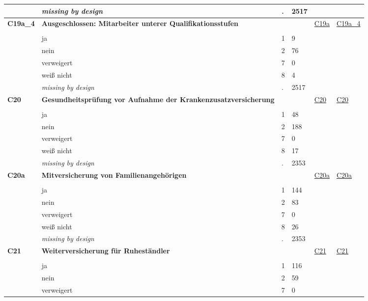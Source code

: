 \begin{longtable}{| L{2.45cm} | L{6cm} | C{1.5cm} | R{1cm} | C{2.25cm} | C{2.25cm} |}
   & \textit{missing by design} & \textit{.} & 2517 &  &  \\ 
   \midrule
\textbf{C19a\_4}\label{var:C19a:4} & \textbf{Ausgeschlossen: Mitarbeiter unterer Qualifikationsstufen} &  &  & \hyperref[C19a]{C19a} & \hyperref[var:suf:C19a:4]{C19a\_4} \\ 
   &  &  &  &  &  \\ 
   & ja & 1 & 9 &  &  \\ 
   & nein & 2 & 76 &  &  \\ 
   & verweigert & 7 & 0 &  &  \\ 
   & weiß nicht & 8 & 4 &  &  \\ 
   & \textit{missing by design} & \textit{.} & 2517 &  &  \\ 
   \midrule
\textbf{C20}\label{var:C20} & \textbf{Gesundheitsprüfung vor Aufnahme der Krankenzusatzversicherung} &  &  & \hyperref[C20]{C20} & \hyperref[var:suf:C20]{C20} \\ 
   &  &  &  &  &  \\ 
   & ja & 1 & 48 &  &  \\ 
   & nein & 2 & 188 &  &  \\ 
   & verweigert & 7 & 0 &  &  \\ 
   & weiß nicht & 8 & 17 &  &  \\ 
   & \textit{missing by design} & \textit{.} & 2353 &  &  \\ 
   \midrule
\textbf{C20a}\label{var:C20a} & \textbf{Mitversicherung von Familienangehörigen} &  &  & \hyperref[C20a]{C20a} & \hyperref[var:suf:C20a]{C20a} \\ 
   &  &  &  &  &  \\ 
   & ja & 1 & 144 &  &  \\ 
   & nein & 2 & 83 &  &  \\ 
   & verweigert & 7 & 0 &  &  \\ 
   & weiß nicht & 8 & 26 &  &  \\ 
   & \textit{missing by design} & \textit{.} & 2353 &  &  \\ 
   \midrule
\textbf{C21}\label{var:C21} & \textbf{Weiterversicherung für Ruheständler} &  &  & \hyperref[C21]{C21} & \hyperref[var:suf:C21]{C21} \\ 
   &  &  &  &  &  \\ 
   & ja & 1 & 116 &  &  \\ 
   & nein & 2 & 59 &  &  \\ 
   & verweigert & 7 & 0 &  &  \\ 

\end{longtable}
